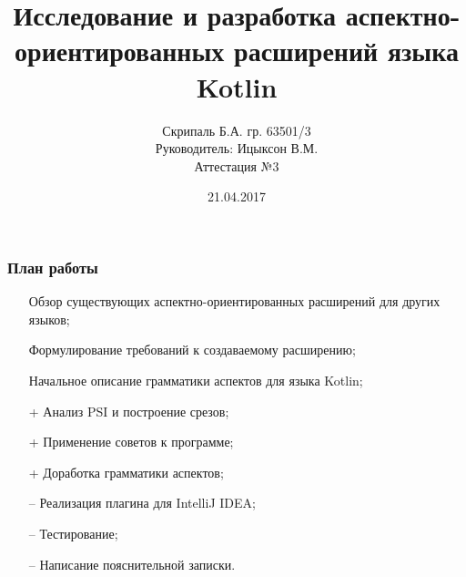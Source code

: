 \documentclass{beamer}
\begin{document}
	
	\title[Разработка АОП для Kotlin]
	{Исследование и разработка аспектно-ориентированных расширений языка 
	Kotlin}
	
	\author[Б.А. Скрипаль]{
		Скрипаль Б.А. гр. 63501/3\\
		Руководитель: Ицыксон В.М.\\
		Аттестация №3
	}
	\date[21.04.2017]{21.04.2017}  
	\frame{\titlepage} 
	
	\begin{frame}
		\frametitle{План работы}
		\begin{itemize}
			\item [\checkmark] Обзор существующих аспектно-ориентированных 
			расширений для других языков;
			\item [\checkmark] Формулирование требований к создаваемому 
			расширению;
			\item [\checkmark] Начальное описание грамматики аспектов для языка 
			Kotlin;
			\item [+] Анализ PSI и построение срезов;
			\item [+] Применение советов к программе;
			\item [+] Доработка грамматики аспектов;
			\item [--] Реализация плагина для IntelliJ IDEA;
			\item [--] Тестирование;
			\item [--] Написание пояснительной записки.
		\end{itemize}
	\end{frame}
	
\end{document}
